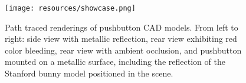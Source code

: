 \begin{figure}[H]
    \texttt{[image: resources/showcase.png]}
    \caption{Path traced renderings of pushbutton CAD models. From left to right: side view with metallic reflection, rear view exhibiting red color bleeding, rear view with ambient occlusion, and pushbutton mounted on a metallic surface, including the reflection of the Stanford bunny model \cite{turkLevoy1994} positioned in the scene.}
    \label{fig:rendering-showcase}
\end{figure}
